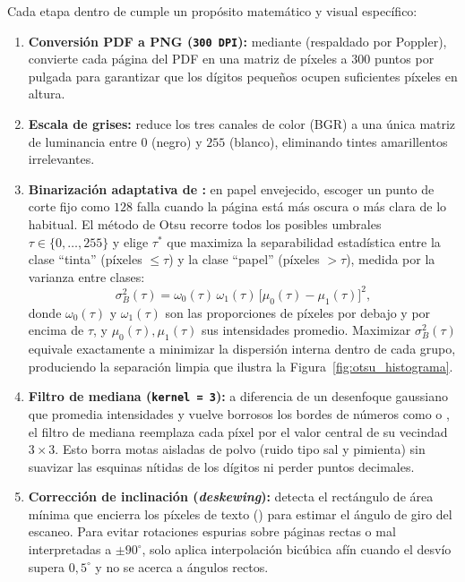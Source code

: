 \documentclass[12pt,letterpaper]{article}
\begin{document}
Cada etapa dentro de  cumple un propósito matemático y visual específico:
\begin{enumerate}
  \item \textbf{Conversión PDF a PNG (\texttt{300 DPI}):} mediante  (respaldado por Poppler), convierte cada página del PDF en una matriz de píxeles a \(300\) puntos por pulgada para garantizar que los dígitos pequeños ocupen suficientes píxeles en altura.
  \item \textbf{Escala de grises:} reduce los tres canales de color (BGR) a una única matriz de luminancia entre \(0\) (negro) y \(255\) (blanco), eliminando tintes amarillentos irrelevantes.
  \item \textbf{Binarización adaptativa de \textcite{otsu1979}:} en papel envejecido, escoger un punto de corte fijo como \(128\) falla cuando la página está más oscura o más clara de lo habitual. El método de Otsu recorre todos los posibles umbrales \(\tau \in \{0, \dots, 255\}\) y elige \(\tau^*\) que maximiza la separabilidad estadística entre la clase ``tinta'' (píxeles \(\le \tau\)) y la clase ``papel'' (píxeles \(> \tau\)), medida por la varianza entre clases:
  \begin{equation}
    \sigma_B^2(\tau) = \omega_0(\tau)\,\omega_1(\tau)\,\bigl[\mu_0(\tau) - \mu_1(\tau)\bigr]^2,
    \label{eq:otsu}
  \end{equation}
  donde \(\omega_0(\tau)\) y \(\omega_1(\tau)\) son las proporciones de píxeles por debajo y por encima de \(\tau\), y \(\mu_0(\tau), \mu_1(\tau)\) sus intensidades promedio. Maximizar \(\sigma_B^2(\tau)\) equivale exactamente a minimizar la dispersión interna dentro de cada grupo, produciendo la separación limpia que ilustra la Figura~\ref{fig:otsu_histograma}.
  \item \textbf{Filtro de mediana (\texttt{kernel = 3}):} a diferencia de un desenfoque gaussiano que promedia intensidades y vuelve borrosos los bordes de números como  o , el filtro de mediana reemplaza cada píxel por el valor central de su vecindad \(3 \times 3\). Esto borra motas aisladas de polvo (ruido tipo sal y pimienta) sin suavizar las esquinas nítidas de los dígitos ni perder puntos decimales.
  \item \textbf{Corrección de inclinación (\emph{deskewing}):} detecta el rectángulo de área mínima que encierra los píxeles de texto () para estimar el ángulo de giro del escaneo. Para evitar rotaciones espurias sobre páginas rectas o mal interpretadas a \(\pm 90^\circ\), solo aplica interpolación bicúbica afín cuando el desvío supera \(0{,}5^\circ\) y no se acerca a ángulos rectos.

\end{enumerate}
\end{document}
